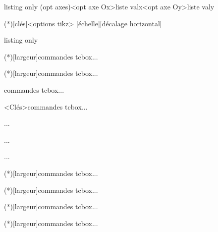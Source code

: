 \documentclass[a4paper,french,11pt]{article}
\begin{document}
\begin{PresCodeTexPL}{listing only}
\AxesTikz[options]  
\FenetreSimpleTikz[options](opt axes)<opt axe Ox>{liste valx}<opt axe Oy>{liste valy}


\MiniSchemaSignes(*)[clés]<options tikz>
[échelle][décalage horizontal]

\end{PresCodeTexPL}

\begin{PresCodeTexPL}{listing only}
\begin{CodePythonLst}(*)[largeur]{commandes tcbox}...\end{CodePythonLst}
\begin{CodePythonLstAlt}(*)[largeur]{commandes tcbox}...\end{CodePythonLstAlt}
\begin{CodePiton}{commandes tcbox}...\end{CodePiton}
\begin{PitonConsole}<Clés>{commandes tcbox}...\end{PitonConsole}
\begin{CodePythontex}[options]{}...\end{CodePythontex}
\begin{CodePythontexAlt}[options]{}...\end{CodePythontexAlt}
\begin{ConsolePythontex}[options]{}...\end{ConsolePythontex}
\begin{CodePythonMinted}(*)[largeur]{commandes tcbox}...\end{CodePythonMinted}
\begin{CodePythonMintedAlt}(*)[largeur]{commandes tcbox}...\end{CodePythonMintedAlt}

\begin{PseudoCode}(*)[largeur]{commandes tcbox}...\end{PseudoCode}
\begin{PseudoCodeAlt}(*)[largeur]{commandes tcbox}...\end{PseudoCodeAlt}
\end{PresCodeTexPL}
\end{document}
